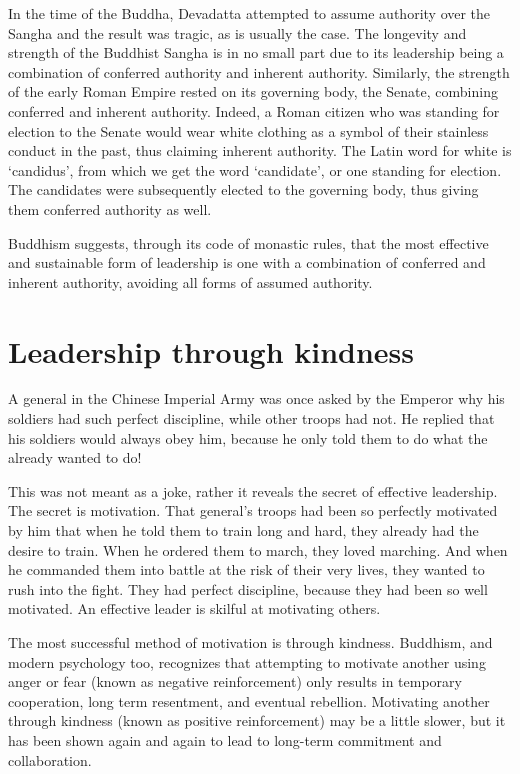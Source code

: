 \documentclass[11pt, openany]{book}
\begin{document}
In the time of the Buddha, Devadatta attempted to assume authority over the Sangha and the result was tragic, as is usually the case. The longevity and strength of the Buddhist Sangha is in no small part due to its leadership being a combination of conferred authority and inherent authority. Similarly, the strength of the early Roman Empire rested on its governing body, the Senate, combining conferred and inherent authority. Indeed, a Roman citizen who was standing for election to the Senate would wear white clothing as a symbol of their stainless conduct in the past, thus claiming inherent authority. The Latin word for white is ‘candidus’, from which we get the word ‘candidate’, or one standing for election. The candidates were subsequently elected to the governing body, thus giving them conferred authority as well.

Buddhism suggests, through its code of monastic rules, that the most effective and sustainable form of leadership is one with a combination of conferred and inherent authority, avoiding all forms of assumed authority.

\section{Leadership through kindness}

A general in the Chinese Imperial Army was once asked by the Emperor why his soldiers had such perfect discipline, while other troops had not. He replied that his soldiers would always obey him, because he only told them to do what the already wanted to do!

This was not meant as a joke, rather it reveals the secret of effective leadership. The secret is motivation. That general’s troops had been so perfectly motivated by him that when he told them to train long and hard, they already had the desire to train. When he ordered them to march, they loved marching.  And when he commanded them into battle at the risk of their very lives, they wanted to rush into the fight. They had perfect discipline, because they had been so well motivated. An effective leader is skilful at motivating others.

The most successful method of motivation is through kindness. Buddhism, and modern psychology too, recognizes that attempting to motivate another using anger or fear (known as negative reinforcement) only results in temporary cooperation, long term resentment, and eventual rebellion. Motivating another through kindness (known as positive reinforcement) may be a little slower, but it has been shown again and again to lead to long-term commitment and collaboration.
\end{document}
